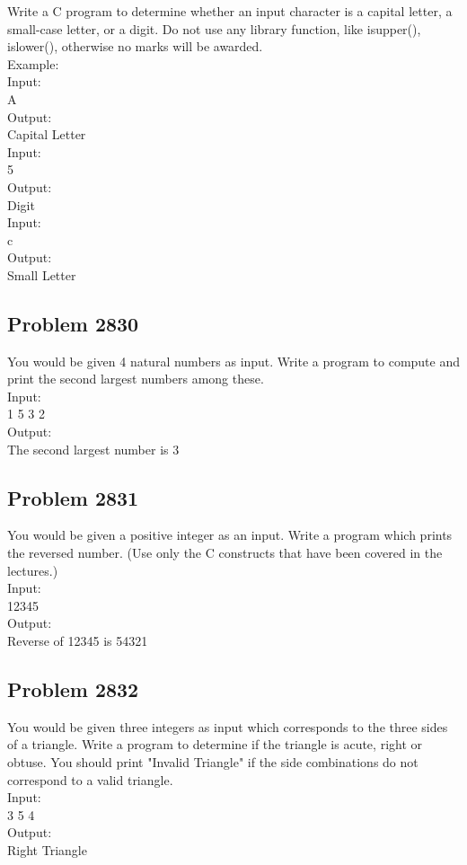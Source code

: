 Write a C program to determine whether an input character is a capital letter, a small-case letter, or a digit. Do not use any library function, like isupper(), islower(), otherwise no marks will be awarded.
\\Example:
\\Input:
\\A
\\Output:
\\Capital Letter
\\Input:
\\5
\\Output:
\\Digit
\\Input:
\\c
\\Output:
\\Small Letter

\subsection{Problem 2830}

You would be given 4 natural numbers as input. Write a program to compute and print the second largest numbers among these.
\\Input:
\\1 5 3 2
\\Output:
\\The second largest number is 3

\subsection{Problem 2831}

You would be given a positive integer as an input. Write a program which prints the reversed number. (Use only the C constructs that have been covered in the lectures.)
\\Input:
\\12345
\\Output:
\\Reverse of 12345 is 54321

\subsection{Problem 2832}

You would be given three integers as input which corresponds to the three sides of a triangle. Write a program to determine if the triangle is acute, right or obtuse. You should print "Invalid Triangle" if the side combinations do not correspond to a valid triangle.
\\Input:
\\3 5 4
\\Output:
\\Right Triangle

